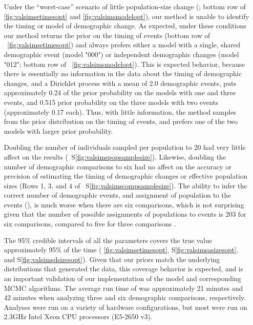 \ifembed{

}{}

Under the ``worst-case'' scenario of little population-size change
(\vsimnochange; bottom row of \figs \ref{fig:valsimsetimesopt} and
\ref{fig:valsimsmodelopt}),
our method is unable to identify the timing or model of demographic change.
As expected, under these conditions our method returns the prior on the timing
of events (bottom row of \fig{}~\ref{fig:valsimsetimesopt})
and always prefers either a model with a single, shared demographic
event (model "000") or independent demographic changes (model "012";
bottom row of \fig{}~\ref{fig:valsimsmodelopt}).
This is expected behavior, because there is essentially no information in the
data about the timing of demographic changes, and a Dirichlet process with a
mean of 2.0 demographic events, puts approximately 0.24 of the prior
probability on the models with one and three events, and 0.515 prior
probability on the three models with two events (approximately 0.17 each).
Thus, with little information, the method samples from the prior distribution
on the timing of events, and prefers one of the two models with larger prior
probability.

Doubling the number of individuals sampled per population to 20 had very little
affect on the results
(\fig{}~S\ref{fig:valsimspopsamplesize}).
Likewise, doubling the number of demographic comparisons to six had no affect
on the accuracy or precision of estimating the timing of demographic changes
or effective population sizes
(Rows 1, 3, and 4 of \fig{}~S\ref{fig:valsimscompsamplesize}).
The ability to infer the correct number of demographic events,
and assignment of population to the events (\etimesets),
is much worse when there are six comparisons, which is
not surprising given that the number of possible assignments
of populations to events is 203 for six comparisons, compared
to five for three comparisons \citep{Bell1934}.

The 95\% credible intervals of all the parameters
covers the true value approximately 95\% of the time
(\figs
\ref{fig:valsimsetimesopt},
S\ref{fig:valsimsasizesopt},
and
S\ref{fig:valsimsdsizesopt}).
Given that our priors match the underlying distributions that generated the
data, this coverage behavior is expected, and is an important validation
of our implementation of the model and corresponding MCMC algorithms.
The average run time of \ecoevolity was approximately 21 minutes and 42 minutes
when analyzing three and six demographic comparisons, respectively.
Analyses were run on a variety of hardware configurations, but most were run on
2.3GHz Intel Xeon CPU processors (E5-2650 v3).


